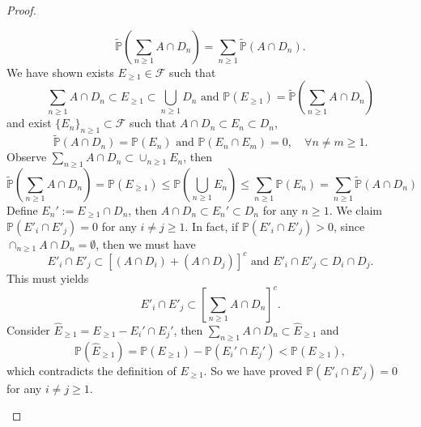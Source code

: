 \documentclass[12pt]{article}
\renewcommand{\(}{\left(}%
\renewcommand{\)}{\right)}%
\renewcommand{\[}{\left[}%
\renewcommand{\]}{\right]}%
\newcommand{\p}{\mathbb{P}}
\newcommand{\f}{\mathscr{F}}
\newtheorem{proof}{Proof.}}
\begin{document}
\begin{proof}
\begin{enumerate}
   		\begin{equation*}
   			\widetilde{\p}\(\sum_{n\geq 1}A\cap D_n\)=\sum_{n\geq 1}\widetilde{\p}(A\cap D_n).
   		\end{equation*}
   		We have shown exists $E_{\geq 1}\in\f$ such that 
   		\begin{equation*}
   			\sum_{n\geq 1}A\cap D_n\subset E_{\geq 1}\subset \bigcup_{n\geq 1}D_n\text{ and }\p(E_{\geq 1})=\widetilde{\p}\(\sum_{n\geq 1}A\cap D_n\)
   		\end{equation*}
   		 and exist $\{E_n\}_{n\geq 1}\subset\f$ such that $A\cap D_n\subset E_n\subset D_n$,
   		\begin{equation*}
   			\widetilde{\p}(A\cap D_n)=\p(E_n)\text{ and }\p(E_n\cap E_m)=0,\quad \forall n\neq m\geq 1.
   		\end{equation*}
   		Observe $\sum_{n\geq 1} A\cap D_n \subset \cup_{n\geq 1}E_n$, then
   		\begin{equation*}
   			\widetilde{\p}\(\sum_{n\geq 1}A\cap D_n\)=\p(E_{\geq 1})\leq \p\(\bigcup_{n\geq 1}E_n\)\leq \sum_{n\geq 1}\p(E_n)= \sum_{n\geq 1}\widetilde{\p}(A\cap D_n)
   		\end{equation*}
   		Define $E_n':=E_{\geq 1}\cap D_n$, then $A\cap D_n\subset E_n'\subset D_n$ for any $n\geq 1$. We claim $\p(E'_{i}\cap E'_{j})=0$ for any $i\neq j\geq 1$. In fact, if $\p(E'_{i}\cap E'_{j})>0$, since $\cap_{n\geq 1}A\cap D_n=\emptyset$, then we must have
   	 \begin{equation*}
   	 	E'_{i}\cap E'_{j}\subset [(A\cap D_i)+(A\cap D_j)]^c\text{ and } E'_{i}\cap E'_{j}\subset D_i\cap D_j.
   	 \end{equation*}
   	 This must yields
   	 \begin{equation*}
   	 	E'_{i}\cap E'_{j}\subset\[\sum_{n\geq 1}A\cap D_n\]^c.
   	 \end{equation*}
   	 Consider $\hat{E}_{\geq 1}=E_{\geq 1}-E_i'\cap E_j'$, then $\sum_{n\geq 1}A\cap D_n\subset \hat{E}_{\geq 1}$ and
   	 \begin{equation*}
   	 	\p(\hat{E}_{\geq 1})=\p(E_{\geq 1})-\p(E_i'\cap E_j')<\p(E_{\geq 1}),
   	 \end{equation*}
   	 which contradicts the definition of $E_{\geq 1}$. So we have proved $\p(E'_{i}\cap E'_{j})=0$ for any $i\neq j\geq 1$.
   	 

\end{enumerate}
\end{proof}
\end{document}
